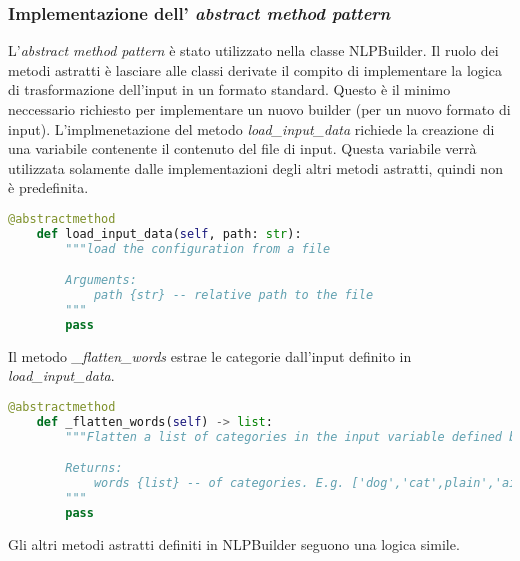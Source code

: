 \subsubsection*{Implementazione dell' \textit{abstract method pattern}}
L'\textit{abstract method pattern} è stato utilizzato nella classe NLPBuilder. Il ruolo dei metodi astratti è lasciare alle classi derivate il compito di implementare la logica di trasformazione dell'input in un formato standard. Questo è il minimo neccessario richiesto per implementare un nuovo builder (per un nuovo formato di input).
\newline\newline
L'implmenetazione del metodo \textit{load\_input\_data} richiede la creazione di una variabile contenente il contenuto del file di input. Questa variabile verrà utilizzata solamente dalle implementazioni degli altri metodi astratti, quindi non è predefinita.
\begin{lstlisting}[language=python]
    @abstractmethod
    def load_input_data(self, path: str):
        """load the configuration from a file

        Arguments:
            path {str} -- relative path to the file
        """
        pass
\end{lstlisting}
Il metodo \textit{\_flatten\_words} estrae le categorie dall'input definito in \textit{load\_input\_data}.
\begin{lstlisting}[language=python]
    @abstractmethod
    def _flatten_words(self) -> list:
        """Flatten a list of categories in the input variable defined by load_input_data.

        Returns:
            words {list} -- of categories. E.g. ['dog','cat',plain','airplain']
        """
        pass
\end{lstlisting}
Gli altri metodi astratti definiti in NLPBuilder seguono una logica simile.

